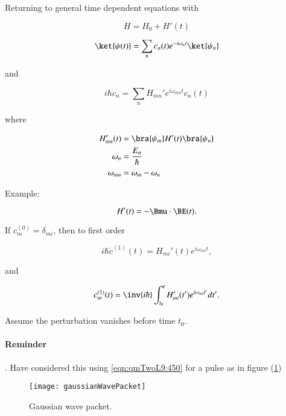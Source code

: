 Returning to general time dependent equations with

\begin{equation}\label{eqn:qmTwoL9:330}
H = H_0 + H'(t)
\end{equation}

\begin{equation}\label{eqn:qmTwoL9:350}
\ket{\psi(t)} = \sum_n c_n(t) e^{-i\omega_n t} \ket{\psi_n}
\end{equation}

and 

\begin{equation}\label{eqn:qmTwoL9:370}
i \hbar \dot{c}_n = \sum_n H_{mn}' e^{i \omega_{mn} t} c_n(t)
\end{equation}

where

\begin{align}\label{eqn:qmTwoL9:390}
H_{mn}'(t) &= \bra{\psi_m} H'(t) \bra{\psi_n} \\
\omega_n &= \frac{E_n}{\hbar} \\
\omega_{mn} &= \omega_m - \omega_n
\end{align}

Example:

\begin{equation}\label{eqn:qmTwoL9:410}
H'(t) = - \Bmu \cdot \BE(t).
\end{equation}

If $c_m^{(0)} = \delta_{mi}$, then to first order

\begin{equation}\label{eqn:qmTwoL9:430}
i \hbar \dot{c}^{(1)}(t) = H_{mi}'(t) e^{i \omega_{mi} t},
\end{equation}

and

\begin{equation}\label{eqn:qmTwoL9:450}
c_m^{(1)}(t) = \inv{i\hbar} \int_{t_0}^t H_{mi}'(t') e^{i \omega_{mi} t'} dt'.
\end{equation}

Assume the perturbation vanishes before time $t_0$.

\paragraph{Reminder}.  Have considered this using \ref{eqn:qmTwoL9:450} for a pulse as in figure (\ref{fig:qmTwoL9:gaussianWavePacket})

\begin{figure}[htp]
   \centering
   \texttt{[image: gaussianWavePacket]}
   \caption{Gaussian wave packet.}\label{fig:qmTwoL9:gaussianWavePacket}
\end{figure}

